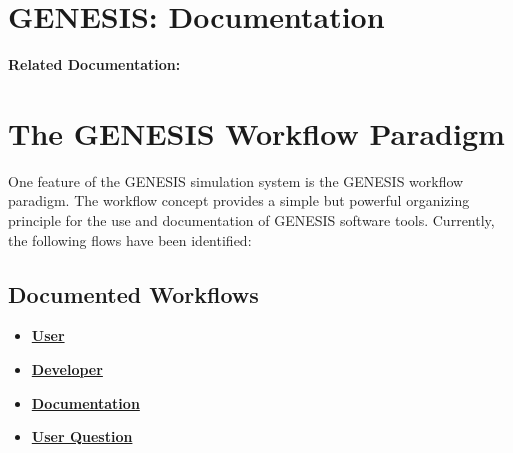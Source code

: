 \documentclass[12pt]{article}
\begin{document}
\section*{GENESIS: Documentation}

{\bf Related Documentation:}

\section*{The GENESIS Workflow Paradigm}

One feature of the GENESIS simulation system is the GENESIS workflow paradigm. The workflow concept provides a simple but powerful organizing principle for the use and documentation of GENESIS software tools. Currently, the following flows have been identified:

\subsection*{Documented Workflows}
\begin{itemize}
\item \href {../workflow-user/workflow-user.tex}{\bf User}
\item \href{../workflow-developer/workflow-developer.tex}{\bf Developer}
\item \href{../workflow-documentation/workflow-documentation.tex}{\bf Documentation}
\item \href{../workflow-user-query/workflow-user-query.tex}{\bf User Question}
\end{itemize}
\end{document}
